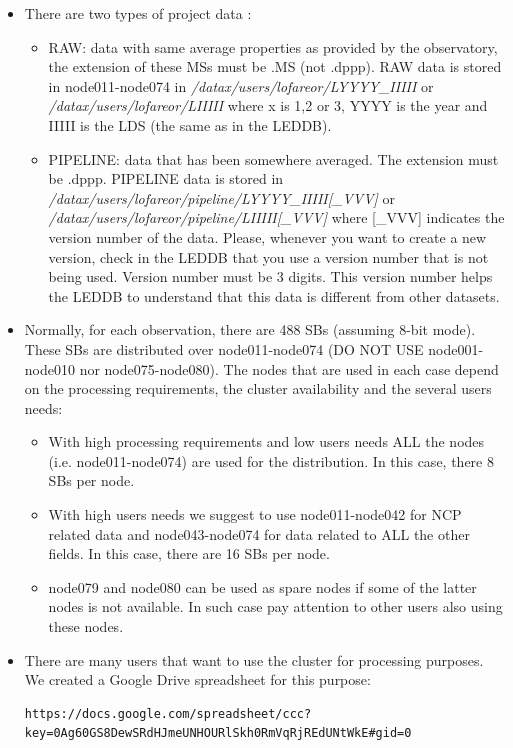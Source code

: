 \documentclass[a4paper,11pt]{article}
\begin{document}
\begin{itemize}
\item There are two types of project data :

\begin{itemize}
\item RAW: data with same average properties as provided by the observatory, the extension of these MSs must be .MS (not .dppp). 
RAW data is stored in node011-node074 in \textit{/datax/users/lofareor/LYYYY\_IIIII} or \textit{/datax/users/lofareor/LIIIII} where x is 1,2 or 3, YYYY is the year and IIIII is the LDS (the same as in the LEDDB).

\item PIPELINE: data that has been somewhere averaged. The extension must be .dppp. PIPELINE data is stored in \textit{/datax/users/lofareor/pipeline/LYYYY\_IIIII[\_VVV]} or \textit{/datax/users/lofareor/pipeline/LIIIII[\_VVV]} where [\_VVV] indicates the version number of the data. Please, whenever you want to create a new version, check in the LEDDB that you use a version number that is not being used. Version number must be 3 digits. This version number helps the LEDDB to understand that this data is different from other datasets.
\end{itemize}

\item Normally, for each observation, there are 488 SBs (assuming 8-bit mode). These SBs are distributed over node011-node074 (DO NOT USE node001-node010 nor node075-node080). The nodes that are used in each case depend on the processing requirements, the cluster availability and the several users needs:
\begin{itemize}
\item With high processing requirements and low users needs ALL the nodes (i.e. node011-node074) are used for the distribution. In this case, there 8 SBs per node. 
\item With high users needs we suggest to use node011-node042 for NCP related data and node043-node074 for data related to ALL the other fields. In this case, there are 16 SBs per node. 
\item node079 and node080 can be used as spare nodes if some of the latter nodes is not available. In such case pay attention to other users also using these nodes.
\end{itemize}

\item There are many users that want to use the cluster for processing purposes. We created a Google Drive spreadsheet for this purpose:
\begin{footnotesize}
\begin{verbatim}
https://docs.google.com/spreadsheet/ccc?key=0Ag60GS8DewSRdHJmeUNHOURlSkh0RmVqRjREdUNtWkE#gid=0
\end{verbatim}
\end{footnotesize}


\end{itemize}
\end{document}
